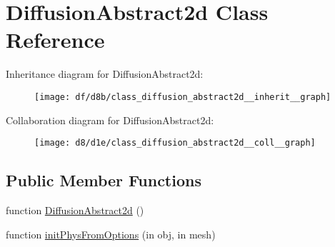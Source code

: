\hypertarget{class_diffusion_abstract2d}{}\section{Diffusion\+Abstract2d Class Reference}
\label{class_diffusion_abstract2d}


Inheritance diagram for Diffusion\+Abstract2d\+:
\nopagebreak
\begin{figure}[H]
\begin{center}
\leavevmode
\texttt{[image: df/d8b/class\_diffusion\_abstract2d\_\_inherit\_\_graph]}
\end{center}
\end{figure}


Collaboration diagram for Diffusion\+Abstract2d\+:
\nopagebreak
\begin{figure}[H]
\begin{center}
\leavevmode
\texttt{[image: d8/d1e/class\_diffusion\_abstract2d\_\_coll\_\_graph]}
\end{center}
\end{figure}
\subsection*{Public Member Functions}
\begin{DoxyCompactItemize}
\item 
function \hyperlink{class_diffusion_abstract2d_a54852c0489fa895e91612217fc7f7590}{Diffusion\+Abstract2d} ()
\item 
function \hyperlink{class_diffusion_abstract2d_a4133dc95948ace276b4bdaa5a6420a90}{init\+Phys\+From\+Options} (in obj, in mesh)
\end{DoxyCompactItemize}
